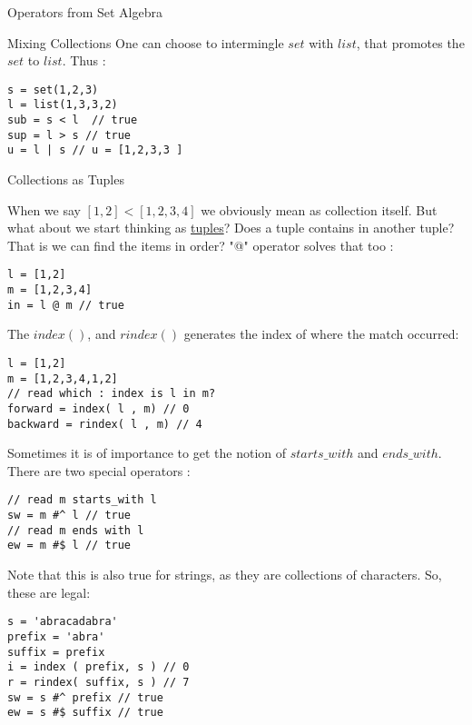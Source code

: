 \begin{section}{Operators from Set Algebra}
\begin{subsection}{Mixing Collections}
One can choose to intermingle $set$ with $list$, that promotes the $set$ to $list$.
Thus :

\begin{lstlisting}[style=JexlStyle]
s = set(1,2,3)
l = list(1,3,3,2)
sub = s < l  // true  
sup = l > s // true 
u = l | s // u = [1,2,3,3 ]
\end{lstlisting}

\end{subsection}


\begin{subsection}{Collections as Tuples}

When we say $[1,2] < [1,2,3,4] $ we obviously mean as collection itself.
But what about we start thinking as \href{https://en.wikipedia.org/wiki/Tuple}{tuples}?
Does a tuple contains in another tuple? That is we can find the items in order? 
"@" operator solves that too :

\begin{lstlisting}[style=JexlStyle]
l = [1,2]
m = [1,2,3,4]
in = l @ m // true 
\end{lstlisting}

The $index()$, and $rindex()$ generates the index of where the match occurred:

\begin{lstlisting}[style=JexlStyle]
l = [1,2]
m = [1,2,3,4,1,2]
// read which : index is l in m?
forward = index( l , m) // 0 
backward = rindex( l , m) // 4   
\end{lstlisting}

Sometimes it is of importance to get the notion of $starts\_with$ and $ends\_with$.
There are two special operators :

\begin{lstlisting}[style=JexlStyle]
// read m starts_with l 
sw = m #^ l // true 
// read m ends with l 
ew = m #$ l // true 
\end{lstlisting}

Note that this is also true for strings, as they are collections of characters.
So, these are legal:

\begin{lstlisting}[style=JexlStyle]
s = 'abracadabra'
prefix = 'abra'
suffix = prefix
i = index ( prefix, s ) // 0 
r = rindex( suffix, s ) // 7 
sw = s #^ prefix // true 
ew = s #$ suffix // true 
\end{lstlisting}

\end{subsection}

\end{section}


